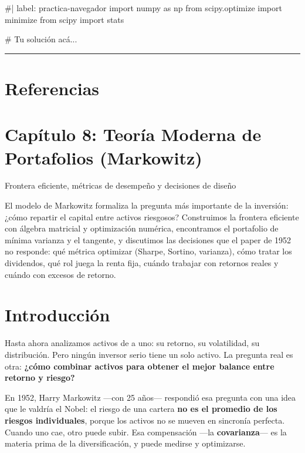 \documentclass[
  spanish,
  letterpaper,
  DIV=11,
  numbers=noendperiod]{scrreprt}
\newenvironment{Shaded}{\begin{snugshade}}{\end{snugshade}}
\newcommand{\NormalTok}[1]{\textcolor[rgb]{0.00,0.23,0.31}{#1}}
\begin{document}
\begin{Shaded}
\begin{Highlighting}[]
\NormalTok{\#| label: practica{-}navegador}
\NormalTok{import numpy as np}
\NormalTok{from scipy.optimize import minimize}
\NormalTok{from scipy import stats}

\NormalTok{\# Tu solución acá...}
\end{Highlighting}
\end{Shaded}

\begin{center}\rule{0.5\linewidth}{0.5pt}\end{center}

\chapter{Referencias}\label{referencias-6}

\label{refs}

\chapter{Capítulo 8: Teoría Moderna de Portafolios
(Markowitz)}\label{capuxedtulo-8-teoruxeda-moderna-de-portafolios-markowitz}

Frontera eficiente, métricas de desempeño y decisiones de diseño

El modelo de Markowitz formaliza la pregunta más importante de la
inversión: ¿cómo repartir el capital entre activos riesgosos?
Construimos la frontera eficiente con álgebra matricial y optimización
numérica, encontramos el portafolio de mínima varianza y el tangente, y
discutimos las decisiones que el paper de 1952 no responde: qué métrica
optimizar (Sharpe, Sortino, varianza), cómo tratar los dividendos, qué
rol juega la renta fija, cuándo trabajar con retornos reales y cuándo
con excesos de retorno.

\hfill\break

\chapter{Introducción}\label{introducciuxf3n-7}

Hasta ahora analizamos activos de a uno: su retorno, su volatilidad, su
distribución. Pero ningún inversor serio tiene un solo activo. La
pregunta real es otra: \textbf{¿cómo combinar activos para obtener el
mejor balance entre retorno y riesgo?}

En 1952, Harry Markowitz ---con 25 años--- respondió esa pregunta con
una idea que le valdría el Nobel: el riesgo de una cartera \textbf{no es
el promedio de los riesgos individuales}, porque los activos no se
mueven en sincronía perfecta. Cuando uno cae, otro puede subir. Esa
compensación ---la \textbf{covarianza}--- es la materia prima de la
diversificación, y puede medirse y optimizarse.
\end{document}
